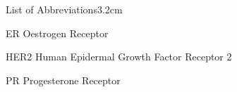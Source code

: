 \begin{mclistof}{List of Abbreviations}{3.2cm}


\item[ER]	Oestrogen Receptor

\item[HER2]	Human Epidermal Growth Factor Receptor 2

\item[PR]	Progesterone Receptor



\end{mclistof} 

